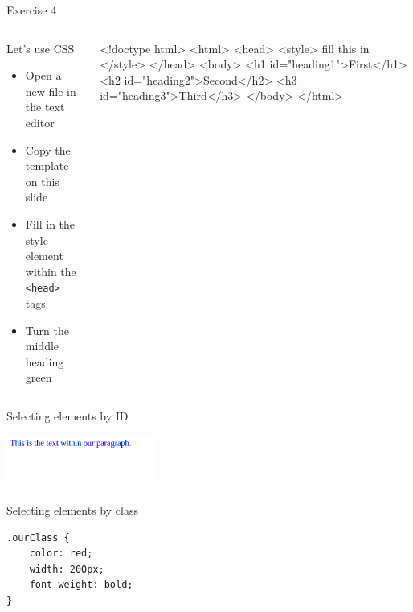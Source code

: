 \documentclass{beamer}
\begin{document}
\begin{frame}[fragile]{Exercise 4}
\begin{columns}
  \begin{column}{0.3\columnwidth}
    \begin{block}{Let's use CSS}
      \begin{itemize}
      \item Open a new file in the text editor
      \item Copy the template on this slide
      \item Fill in the style element within the \Verb"<head>" tags
      \item Turn the middle heading green
      \end{itemize}
    \end{block}
  \end{column}

  \begin{column}{0.6\columnwidth}
    \begin{block}{}
      \begin{semiverbatim}
<!doctype html>
<html>
  <head>
    <style>
      fill this in
    </style>
  </head>
  <body>
    <h1 id="heading1">First</h1>
    <h2 id="heading2">Second</h2>
    <h3 id="heading3">Third</h3>
  </body>
</html>
      \end{semiverbatim}
    \end{block}
  \end{column}
\end{columns}
\end{frame}

\begin{frame}{Selecting elements by ID}
\begin{block}{}
\includegraphics[width=5cm]{byId.png}
\end{block}
\end{frame}

\begin{frame}[fragile]{Selecting elements by class}
 \begin{block}{}
\begin{verbatim}
.ourClass {
    color: red;
    width: 200px;
    font-weight: bold;
}
\end{verbatim}
\end{block}
\end{frame}
\end{document}
